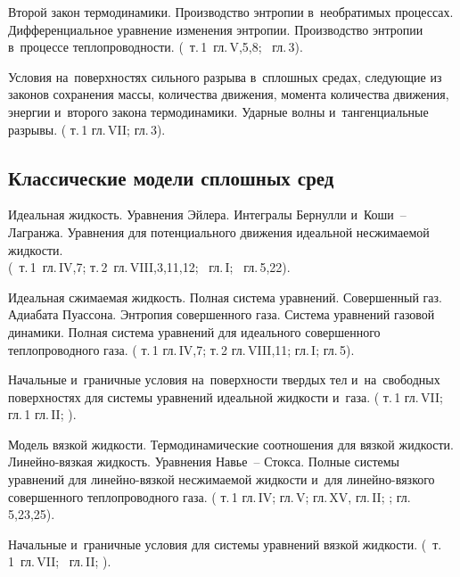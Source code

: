 \documentclass[a4paper,11pt]{article}
\def\tm#1{т.\,#1}
\def\g#1{гл.\,#1}
\def\gp#1#2{гл.\,#1\;\textsection#2}
\begin{document}
\begin{nums}{-2}
\item Второй закон термодинамики. Производство энтропии в~необратимых процессах.
Дифференциальное уравнение изменения энтропии. Производство энтропии в~процессе
теплопроводности. (\cite{1}~\tm{1}~\gp{V}{4,5,8}; \cite{2}~\gp{3}{15}).

\item Условия на~поверхностях сильного разрыва в~сплошных средах,
следующие из законов сохранения массы, количества движения, момента количества движения,
энергии и~второго закона термодинамики. Ударные волны и~тангенциальные разрывы.
(\cite{1} \tm{1} \gp{VII}{4}; \cite{2} \gp{3}{18}).

\subsection*{Классические модели сплошных сред}

\item Идеальная жидкость. Уравнения Эйлера. Интегралы Бернулли и~Коши~-- Лагранжа.
Уравнения для потенциального движения идеальной несжимаемой жидкости.\\
(\cite{1}~\tm{1}~\gp{IV}{1,7}; \tm{2}~\gp{VIII}{2,3,11,12}; \cite{3}~\g{I}; \cite{2}~\gp{5}{20,22}).

\item  Идеальная сжимаемая жидкость. Полная система уравнений. Совершенный газ.
Адиабата Пуассона. Энтропия совершенного газа. Система уравнений
газовой динамики. Полная система уравнений для идеального совершенного теплопроводного газа.
(\cite{1} \tm{1} \gp{IV}{2,7}; \tm{2} \gp{VIII}{5,11}; \cite{5} \gp{I}{7}; \cite{2} \gp{5}{25}).

\item Начальные и~граничные условия на~поверхности твердых тел и~на~свободных
поверхностях для системы уравнений идеальной жидкости и~газа.
(\cite{1} \tm{1} \gp{VII}{1}; \cite{5} \gp{1}{7} \gp{II}{2}; \cite{7}).

\item Модель вязкой жидкости. Термодинамические соотношения для вязкой жидкости.
Линейно-вязкая жидкость. Уравнения Навье~-- Стокса. Полные системы уравнений
для линейно-вязкой несжимаемой жидкости и~для линейно-вязкого совершенного
теплопроводного газа.
(\cite{1} \tm{1} \gp{IV}{2}; \gp{V}{7}; \cite{4} \gp{XV}{141},
\cite{6} \gp{II}{2}; \cite{7}; \cite{2} \gp{5}{20,23,25}).

\item Начальные и~граничные условия для системы уравнений вязкой жидкости.
(\cite{1}~\tm{1}~\gp{VII}{1}; \cite{6}~\gp{II}{2}; \cite{7}).


\end{nums}
\end{document}
